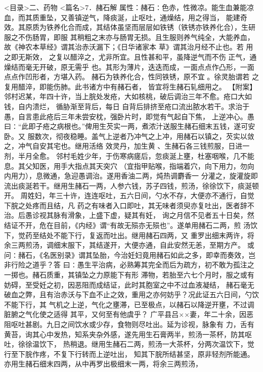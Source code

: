 \documentclass[a4paper,12pt,UTF8,twoside]{ctexbook}
\begin{document}
<目录>二、药物
<篇名>7．赭石解
属性：赭石∶色赤，性微凉。能生血兼能凉血，而其质重坠，又善镇逆气，降痰涎，止呕吐，通燥结，用之得当， 
能建奇效。其原质为铁养化合而成，其结体虽坚而层层如铁锈（铁锈亦铁养化合），生研服之不伤肠胃，即服 
其稍粗之末亦与肠胃无损。且生服则养气纯全，大能养血，故《神农本草经》谓其治赤沃漏下；《日华诸家本 
草》谓其治月经不止也。若 用之即无斯效， 之复以醋淬之，尤非所宜。且性甚和平，虽降逆气而不伤 
正气，通燥结而毫无开破，原无需乎 也。其形为薄片，迭迭而成，一面点点作凸形，一面 
点点作凹形者，方堪入药。 
赭石为铁养化合，性同铁锈，原不宜 。徐灵胎谓若 之复用醋淬，即能伤肺。此书诸方中有赭石者， 
皆宜将生赭石轧细用之。 
【附案】邻村迟某，年四十许，当上脘处发疮，大如核桃，破后调治三年不愈。疮口大如钱，自内溃烂， 
循胁渐至背后，每日 
自背后排挤至疮口流出脓水若干。求治于愚，自言患此疮后三年未尝安枕，强卧片时，即觉有气起自下焦， 
上逆冲心。愚曰∶“此即子疮之病根也。”俾用生芡实一两，煮浓汁送服生赭石细末五钱，遂可安卧。又 
服数次，彻夜稳睡。盖气上逆者乃冲气之上冲，用赭石以镇之，芡实以敛之，冲气自安其宅也。继用活络 
效灵丹，加生黄 、生赭石各三钱煎服，日进一剂，半月全愈。 
邻村毛姓少年，于伤寒病瘥后，忽痰涎上壅，杜塞咽喉，几不能息。其父知医，用手大指点其天突穴 
（宜指甲贴喉，指端着穴，向下用力，勿向内用力），息微通，急迎愚调治。遂用香油二两，炖热调麝香一 
分灌之，旋灌旋即流出痰涎若干。继用生赭石一两，人参六钱，苏子四钱，煎汤，徐徐饮下，痰涎顿开。 
周姓妇，年三十许，连连呕吐，五六日间，勺水不存，大便亦不通行，自觉下脘之处疼而且结，凡 
药之有味者入口即吐，其无味者须臾亦复吐出，医者辞不治。后愚诊视其脉有滑象，上盛下虚，疑其有妊， 
询之月信不见者五十日矣，然结证不开，危在目前，《内经》谓“有故无殒亦无殒也”。遂单用赭石二两，煎 
汤饮下，觉药至结处不能下行，复返而吐出。继用赭石四两，又 
重罗出细末两许，将余三两煎汤，调细末服下，其结遂开，大便亦通，自此安然无恙，至期方产。 
或问∶赭石，《名医别录》谓其坠胎，今治妊妇竟用赭石如此之多，即幸而奏效，岂非行险之道乎？答 
曰∶愚生平治病，必熟筹其完全而后为疏方，初不敢为孤注之一掷也。赭石质重，其镇坠之力原能下有形 
滞物，若胎至六七个月时，服之或有妨碍，至受妊之初，因恶阻而成结证，此时其胞室之中不过血液凝结， 
赭石毫无破血之弊，且有治赤沃与下血不止之效，重用之亦何妨乎？况此证五六日间，勺饮不能下行，其 
气机之上逆，气化之壅滞，已至极点，以赭石以降逆开壅，不过调脏腑之气化使之适得 
其平，又何至有他虞乎？ 
广平县吕××妻，年二十余，因恶阻呕吐甚剧。九日之间饮水或少存，食物则尽吐出。延为诊视，脉象有 
力，舌有黄苔，询其心中发热，知系夹杂外感，遂先用生石膏两半，煎汤一茶杯，防其呕吐，徐徐温饮下， 
热稍退。继用生赭石二两，煎汤一大茶杯，分两次温饮下，觉行至下脘作疼，不复下行转而上逆吐出， 
知其下脘所结甚坚，原非轻剂所能通。亦用生赭石细末四两，从中再罗出极细末一两，将余三两煎汤， 
\end{document}
